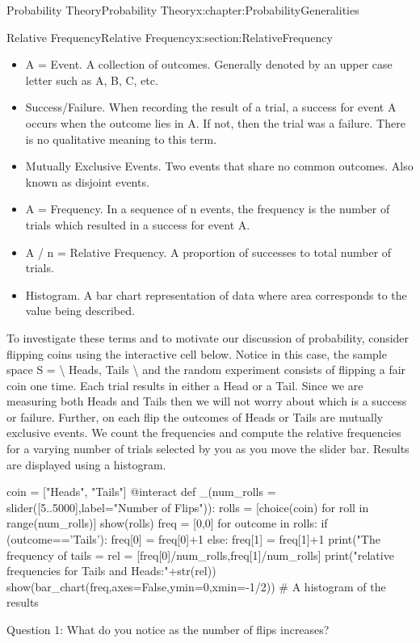 \documentclass[oneside,10pt,]{book}
\numberwithin{equation}{section}
\begin{document}
\begin{chapterptx}{Probability Theory}{}{Probability Theory}{}{}{x:chapter:ProbabilityGeneralities}
\begin{sectionptx}{Relative Frequency}{}{Relative Frequency}{}{}{x:section:RelativeFrequency}
\begin{itemize}[label=\textbullet]
\item{}A = Event. A collection of outcomes.  Generally denoted by an upper case letter such as A, B, C, etc.%
\item{}Success\slash{}Failure. When recording the result of a trial, a success for event A occurs when the outcome lies in A. If not, then the trial was a failure. There is no qualitative meaning to this term.%
\item{}Mutually Exclusive Events. Two events that share no common outcomes. Also known as disjoint events.%
\item{}\textbar{}A\textbar{} = Frequency. In a sequence of n events, the frequency is the number of trials which resulted in a success for event A.%
\item{}\textbar{}A\textbar{} \slash{} n = Relative Frequency. A proportion of successes to total number of trials.%
\item{}Histogram. A bar chart representation of data where area corresponds to the value being described.%
\end{itemize}
To investigate these terms and to motivate our discussion of probability, consider flipping coins using the interactive cell below. Notice in this case, the sample space S = \textbackslash{}\textbraceleft{} Heads, Tails \textbackslash{}\textbraceright{} and the random experiment consists of flipping a fair coin one time. Each trial results in either a Head or a Tail. Since we are measuring both Heads and Tails then we will not worry about which is a success or failure. Further, on each flip the outcomes of Heads or Tails are mutually exclusive events. We count the frequencies and compute the relative frequencies for a varying number of trials selected by you as you move the slider bar. Results are displayed using a histogram.%
\begin{sageinput}
coin = ["Heads", "Tails"]
@interact
def _(num_rolls = slider([5..5000],label="Number of Flips")):
	rolls = [choice(coin) for roll in range(num_rolls)]
	show(rolls)   
	freq = [0,0]
	for outcome in rolls:
		if (outcome=='Tails'):
			freq[0] = freq[0]+1
		else:
			freq[1] = freq[1]+1
	print("The frequency of tails = %
	rel = [freq[0]/num_rolls,freq[1]/num_rolls]
	print("\nThe relative frequencies for Tails and Heads:"+str(rel))
	show(bar_chart(freq,axes=False,ymin=0,xmin=-1/2))     #  A histogram of the results
\end{sageinput}
Question 1: What do you notice as the number of flips increases?%
\par

\end{sectionptx}
\end{chapterptx}
\end{document}
